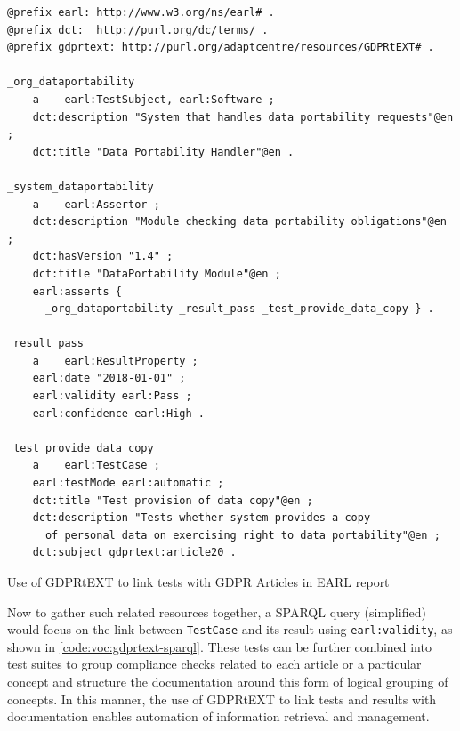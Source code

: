 \begin{listing}
\begin{verbatim}
@prefix earl: http://www.w3.org/ns/earl# .
@prefix dct:  http://purl.org/dc/terms/ .
@prefix gdprtext: http://purl.org/adaptcentre/resources/GDPRtEXT# .

_org_dataportability
    a    earl:TestSubject, earl:Software ;
    dct:description "System that handles data portability requests"@en ;
    dct:title "Data Portability Handler"@en .

_system_dataportability
    a    earl:Assertor ;
    dct:description "Module checking data portability obligations"@en ;
    dct:hasVersion "1.4" ;
    dct:title "DataPortability Module"@en ;
    earl:asserts { 
      _org_dataportability _result_pass _test_provide_data_copy } .

_result_pass
    a    earl:ResultProperty ;
    earl:date "2018-01-01" ;
    earl:validity earl:Pass ;
    earl:confidence earl:High .

_test_provide_data_copy
    a    earl:TestCase ;
    earl:testMode earl:automatic ;
    dct:title "Test provision of data copy"@en ;
    dct:description "Tests whether system provides a copy 
      of personal data on exercising right to data portability"@en ;
    dct:subject gdprtext:article20 .
\end{verbatim}
\label{code:voc:gdprtext-earl}
\caption{Use of GDPRtEXT to link tests with GDPR Articles in EARL report}
\end{listing}

Now to gather such related resources together, a SPARQL query (simplified) would focus on the link between \texttt{TestCase} and its result using \texttt{earl:validity}, as shown in \autoref{code:voc:gdprtext-sparql}.
These tests can be further combined into test suites to group compliance checks related to each article or a particular concept and structure the documentation around this form of logical grouping of concepts.
In this manner, the use of GDPRtEXT to link tests and results with documentation enables automation of information retrieval and management.

